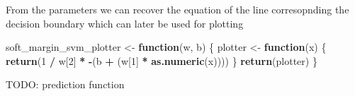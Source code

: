 \documentclass[]{article}
\newenvironment{Shaded}{\begin{snugshade}}{\end{snugshade}}
\newcommand{\KeywordTok}[1]{\textcolor[rgb]{0.13,0.29,0.53}{\textbf{#1}}}
\newcommand{\DecValTok}[1]{\textcolor[rgb]{0.00,0.00,0.81}{#1}}
\newcommand{\StringTok}[1]{\textcolor[rgb]{0.31,0.60,0.02}{#1}}
\newcommand{\ControlFlowTok}[1]{\textcolor[rgb]{0.13,0.29,0.53}{\textbf{#1}}}
\newcommand{\OperatorTok}[1]{\textcolor[rgb]{0.81,0.36,0.00}{\textbf{#1}}}
\newcommand{\NormalTok}[1]{#1}
\begin{document}
\begin{Shaded}
\end{Shaded}

From the parameters we can recover the equation of the line
corresopnding the decision boundary which can later be used for plotting

\begin{Shaded}
\begin{Highlighting}[]
\NormalTok{soft_margin_svm_plotter <-}\StringTok{ }\ControlFlowTok{function}\NormalTok{(w, b) \{}
\NormalTok{  plotter <-}\StringTok{ }\ControlFlowTok{function}\NormalTok{(x) \{}
    \KeywordTok{return}\NormalTok{(}\DecValTok{1} \OperatorTok{/}\StringTok{ }\NormalTok{w[}\DecValTok{2}\NormalTok{] }\OperatorTok{*}\StringTok{ }\OperatorTok{-}\NormalTok{(b }\OperatorTok{+}\StringTok{ }\NormalTok{(w[}\DecValTok{1}\NormalTok{] }\OperatorTok{*}\StringTok{ }\KeywordTok{as.numeric}\NormalTok{(x))))}
\NormalTok{  \}}
  \KeywordTok{return}\NormalTok{(plotter)}
\NormalTok{\}}
\end{Highlighting}
\end{Shaded}

TODO: prediction function
\end{document}
